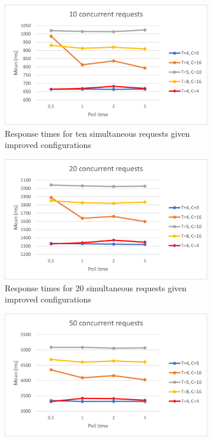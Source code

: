 \begin{figure}[H]
    \centering
    \begin{subfigure}[b]{0.45\textwidth}
        \centering
        \includegraphics[width=\textwidth]{images/10v3.png}
        \caption{Response times for ten simultaneous requests given improved configurations}
        \label{fig:10v3}
    \end{subfigure}
    \hfill
    \begin{subfigure}[b]{0.45\textwidth}
        \centering
        \includegraphics[width=\textwidth]{images/20v3.png}
        \caption{Response times for 20 simultaneous requests given improved configurations}
        \label{fig:20v3}
    \end{subfigure}
    \hfill
    \begin{subfigure}[b]{0.45\textwidth}
        \centering
        \includegraphics[width=\textwidth]{images/50v3.png}

\end{subfigure}
\end{figure}
